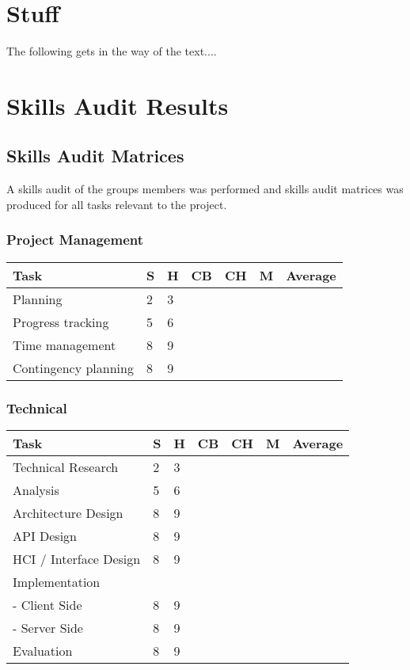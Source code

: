 \chapter{Stuff} \label{Chapter:Stuff}
The following gets in the way of the text....

\chapter{Skills Audit Results} \label{Chapter:Skills Audit Results}

\section{Skills Audit Matrices} 
\label{Section:Skills Audit Matrices}
A skills audit of the groups members was performed and skills audit matrices was produced for all tasks relevant to the project.

\subsection{Project Management} 
\begin{tabular}{ l || l | l | l | l | l || l}
  Task & S & H & CB & CH & M & Average \\ \hline
  Planning & 2 & 3 \\ 
  Progress tracking & 5 & 6 \\
  Time management & 8 & 9 \\
  Contingency planning & 8 & 9 \\
\end{tabular}

\subsection{Technical} 
\begin{tabular}{ l || l | l | l | l | l || l}
  Task & S & H & CB & CH & M & Average \\ \hline
  Technical Research & 2 & 3 \\ 
  Analysis & 5 & 6 \\
  Architecture Design & 8 & 9 \\
  API Design & 8 & 9 \\
  HCI / Interface Design & 8 & 9 \\
  Implementation \\
   - Client Side & 8 & 9 \\
   - Server Side & 8 & 9 \\
  Evaluation & 8 & 9 \\
\end{tabular}


